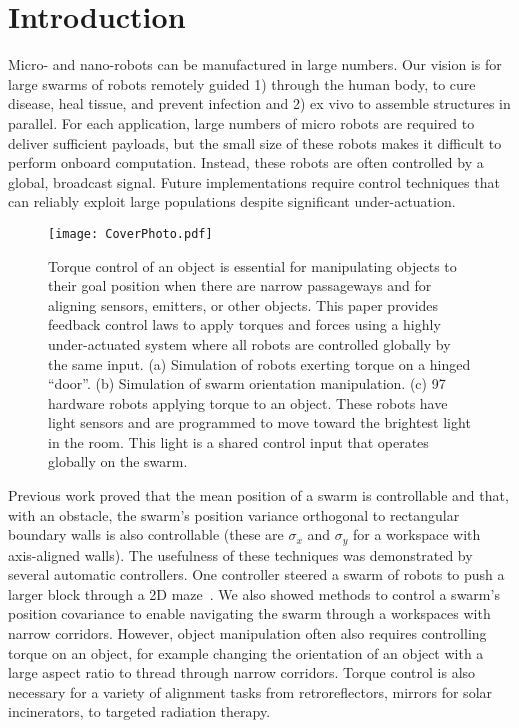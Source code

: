 \section{Introduction}\label{sec:Intro}
Micro- and nano-robots can be manufactured in large numbers.
Our vision is for large swarms of robots remotely guided 1) through the human body, to cure disease, heal tissue, and prevent infection and 2) ex vivo to assemble structures in parallel. 
 For each application, large numbers of micro robots are required  to deliver sufficient payloads, but the small size of these robots makes it difficult to perform onboard computation.  Instead, these robots are often controlled by a global, broadcast signal. 
 Future implementations require control techniques that can reliably exploit large populations despite significant under-actuation.  
 

\begin{figure}
\begin{center}
	\texttt{[image: CoverPhoto.pdf]}
\end{center}
\vspace{-1em}
\caption{\label{fig:FirstImage}
Torque control of an object is essential for manipulating objects to their goal position  when there are narrow passageways and for aligning sensors, emitters, or other objects. 
This paper provides feedback control laws to apply torques and forces using a highly under-actuated system where all 
robots are controlled globally by the same input. 
(a) Simulation of robots exerting torque on a hinged ``door''.
(b) Simulation of swarm orientation manipulation.
(c) 97 hardware robots applying torque to an object. These robots have light sensors and are programmed to move toward the brightest light in the room.  This light is a shared control input that operates globally on the swarm.
}
\vspace{-1em}
\end{figure}


Previous work proved that the mean position of a swarm is controllable and that, with an obstacle, the swarm's position variance orthogonal to rectangular boundary walls  is also controllable
(these are $\sigma_x$ and $\sigma_y$ for a workspace with axis-aligned walls). 
The usefulness of these techniques was demonstrated by several automatic controllers. One controller steered a swarm of robots to push a larger block through a 2D maze~\cite{ShahrokhiIROS2015}. 
We also showed methods to control a swarm's position covariance to enable navigating the swarm through a workspaces with narrow corridors.  
However, object manipulation often also requires controlling torque on an object, for example changing the orientation of an object with a large aspect ratio to thread through narrow corridors.
Torque control  is also necessary for a variety of alignment tasks from retroreflectors, mirrors for solar incinerators, to targeted radiation therapy.

